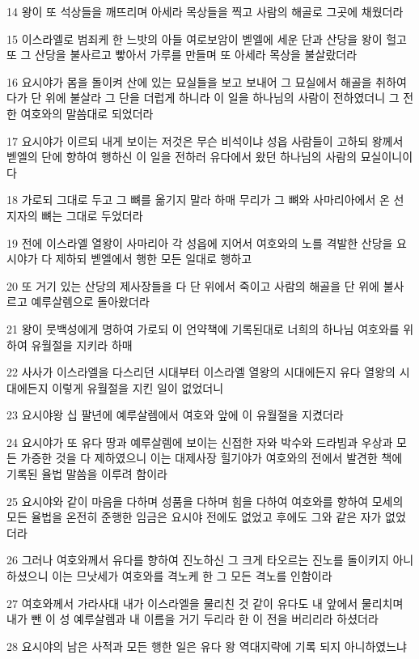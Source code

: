 \par 14 왕이 또 석상들을 깨뜨리며 아세라 목상들을 찍고 사람의 해골로 그곳에 채웠더라
\par 15 이스라엘로 범죄케 한 느밧의 아들 여로보암이 벧엘에 세운 단과 산당을 왕이 헐고 또 그 산당을 불사르고 빻아서 가루를 만들며 또 아세라 목상을 불살랐더라
\par 16 요시야가 몸을 돌이켜 산에 있는 묘실들을 보고 보내어 그 묘실에서 해골을 취하여다가 단 위에 불살라 그 단을 더럽게 하니라 이 일을 하나님의 사람이 전하였더니 그 전한 여호와의 말씀대로 되었더라
\par 17 요시야가 이르되 내게 보이는 저것은 무슨 비석이냐 성읍 사람들이 고하되 왕께서 벧엘의 단에 향하여 행하신 이 일을 전하러 유다에서 왔던 하나님의 사람의 묘실이니이다
\par 18 가로되 그대로 두고 그 뼈를 옮기지 말라 하매 무리가 그 뼈와 사마리아에서 온 선지자의 뼈는 그대로 두었더라
\par 19 전에 이스라엘 열왕이 사마리아 각 성읍에 지어서 여호와의 노를 격발한 산당을 요시야가 다 제하되 벧엘에서 행한 모든 일대로 행하고
\par 20 또 거기 있는 산당의 제사장들을 다 단 위에서 죽이고 사람의 해골을 단 위에 불사르고 예루살렘으로 돌아왔더라
\par 21 왕이 뭇백성에게 명하여 가로되 이 언약책에 기록된대로 너희의 하나님 여호와를 위하여 유월절을 지키라 하매
\par 22 사사가 이스라엘을 다스리던 시대부터 이스라엘 열왕의 시대에든지 유다 열왕의 시대에든지 이렇게 유월절을 지킨 일이 없었더니
\par 23 요시야왕 십 팔년에 예루살렘에서 여호와 앞에 이 유월절을 지켰더라
\par 24 요시야가 또 유다 땅과 예루살렘에 보이는 신접한 자와 박수와 드라빔과 우상과 모든 가증한 것을 다 제하였으니 이는 대제사장 힐기야가 여호와의 전에서 발견한 책에 기록된 율법 말씀을 이루려 함이라
\par 25 요시야와 같이 마음을 다하며 성품을 다하며 힘을 다하여 여호와를 향하여 모세의 모든 율법을 온전히 준행한 임금은 요시야 전에도 없었고 후에도 그와 같은 자가 없었더라
\par 26 그러나 여호와께서 유다를 향하여 진노하신 그 크게 타오르는 진노를 돌이키지 아니하셨으니 이는 므낫세가 여호와를 격노케 한 그 모든 격노를 인함이라
\par 27 여호와께서 가라사대 내가 이스라엘을 물리친 것 같이 유다도 내 앞에서 물리치며 내가 뺀 이 성 예루살렘과 내 이름을 거기 두리라 한 이 전을 버리리라 하셨더라
\par 28 요시야의 남은 사적과 모든 행한 일은 유다 왕 역대지략에 기록 되지 아니하였느냐
